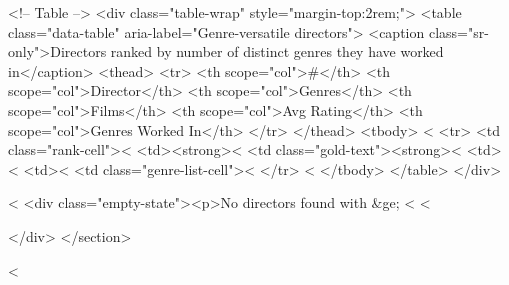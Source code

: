     <!-- Table -->
    <div class="table-wrap" style="margin-top:2rem;">
      <table class="data-table" aria-label="Genre-versatile directors">
        <caption class="sr-only">Directors ranked by number of distinct genres they have worked in</caption>
        <thead>
          <tr>
            <th scope="col">#</th>
            <th scope="col">Director</th>
            <th scope="col">Genres</th>
            <th scope="col">Films</th>
            <th scope="col">Avg Rating</th>
            <th scope="col">Genres Worked In</th>
          </tr>
        </thead>
        <tbody>
          <%
          <tr>
            <td class="rank-cell"><%
            <td><strong><%
            <td class="gold-text"><strong><%
            <td><%
            <td><%
            <td class="genre-list-cell"><%
          </tr>
          <%
        </tbody>
      </table>
    </div>

    <%
    <div class="empty-state"><p>No directors found with &ge; <%
    <%

  </div>
</section>

<%
